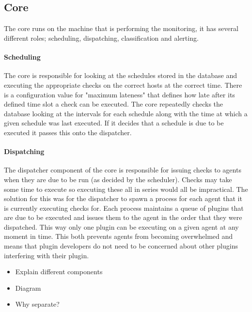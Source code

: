 \documentclass[bsc,logo,twoside]{infthesis}
\begin{document}
\subsection{Core}
\paragraph*{}
	The core runs on the machine that is performing the monitoring, it has several
	different roles; scheduling, dispatching, classification and alerting.
	
\paragraph*{Scheduling}
	The core is responsible for looking at the schedules stored in the database and
	executing the appropriate checks on the correct hosts at the correct time. There
	is a configuration value for "maximum lateness" that defines how late after its
	defined time slot a check can be executed.  The core repeatedly checks the
	database looking at the intervals for each schedule along with the time at which
	a given schedule was last executed.  If it decides that a schedule is due to be
	executed it passes this onto the dispatcher.
	
\paragraph*{Dispatching}
	The dispatcher component of the core is responsible for issuing checks to agents
	when they are due to be run (as decided by the scheduler).  Checks may take some
	time to execute so executing these all in series would all be impractical. The
	solution for this was for the dispatcher to spawn a process for each agent that
	it is currently executing checks for.  Each process maintains a queue of plugins
	that are due to be executed and issues them to the agent in the order that they
	were dispatched.  This way only one plugin can be executing on a given agent at
	any moment in time.  This both prevents agents from becoming overwhelmed and
	means that plugin developers do not need to be concerned about other plugins
	interfering with their plugin.

\begin{itemize}
	\item Explain different components
	\item Diagram
	\item Why separate?
\end{itemize}
\end{document}

